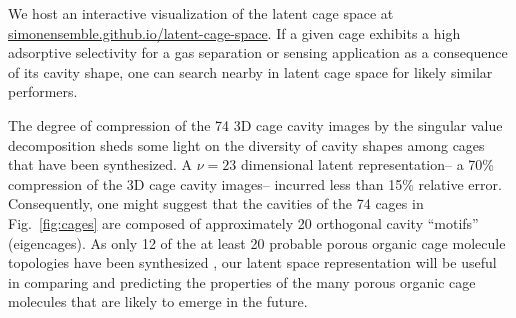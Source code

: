 \documentclass[journal=jacsat,manuscript=article,layout=traditional]{achemso}
\begin{document}
We host an interactive visualization of the latent cage space at \url{simonensemble.github.io/latent-cage-space}. If a given cage exhibits a high adsorptive selectivity for a gas separation or sensing application as a consequence of its cavity shape, one can search nearby in latent cage space for likely similar performers.

The degree of compression of the 74 3D cage cavity images by the singular value decomposition sheds some light on the diversity of cavity shapes among cages that have been synthesized. A $\nu=23$ dimensional latent representation-- a 70\% compression of the 3D cage cavity images-- incurred less than 15\% relative error. Consequently, one might suggest that the cavities of the 74 cages in Fig.~\ref{fig:cages} are composed of approximately 20 orthogonal cavity ``motifs'' (eigencages). As only 12 of the at least 20 probable porous organic cage molecule topologies have been synthesized \cite{santolini2017topological}, our latent space representation will be useful in comparing and predicting the properties of the many porous organic cage molecules that are likely to emerge in the future.
\end{document}
